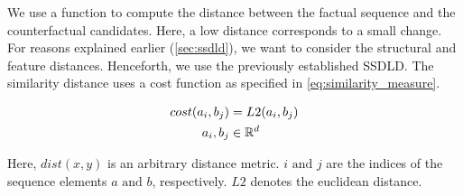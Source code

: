 \documentclass[./../../paper.tex]{subfiles}
\begin{document}
We use a function to compute the distance between the factual sequence and the counterfactual candidates. Here, a low distance corresponds to a small change. For reasons explained earlier (\autoref{sec:ssdld}), we want to consider the structural and feature distances. Henceforth, we use the previously established \gls{SSDLD}. 
The similarity distance uses a cost function as specified in \autoref{eq:similarity_measure}.

\begin{align}
    \label{eq:similarity_measure}
    cost(a_i, b_j)      & = L2(a_i, b_j) \\
    a_i,b_j        & \in \mathbb{R}^d \nonumber
\end{align}

\noindent Here, $dist(x,y)$ is an arbitrary distance metric. $i \text{ and } j$ are the indices of the sequence elements $a \text{ and } b$, respectively. $L2$ denotes the euclidean distance. 
\end{document}
